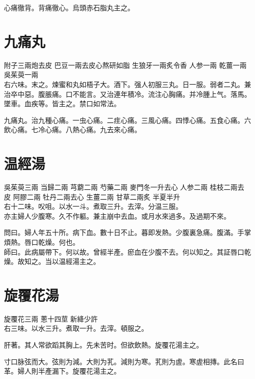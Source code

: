 心痛徹背。背痛徹心。烏頭赤石脂丸主之。

\section{九痛丸}

附子{\scriptsize 三兩炮去皮} 巴豆{\scriptsize 一兩去皮心熬研如脂} 生狼牙{\scriptsize 一兩炙令香} 人参{\scriptsize 一兩} 乾薑{\scriptsize 一兩} 吳茱萸{\scriptsize 一兩}\\
右六味。末之。煉蜜和丸如梧子大。酒下。强人初服三丸。日一服。弱者二丸。兼治卒中惡。腹脹痛。口不能言。又治連年積冷。流注心胸痛。并冷腫上气。落馬。墜車。血疾等。皆主之。禁口如常法。{\wuben}

{\dengben}%

九痛丸。治九種心痛。{\khaaitp 一虫心痛。二疰心痛。三風心痛。四悸心痛。五食心痛。六飲心痛。七冷心痛。八熱心痛。九去來心痛。}

\section{温經湯}

吳茱萸{\scriptsize 三兩} 当歸{\scriptsize 二兩} 芎藭{\scriptsize 二兩} 芍藥{\scriptsize 二兩} 麥門冬{\scriptsize 一升去心} 人参{\scriptsize 二兩} 桂枝{\scriptsize 二兩去皮} 阿膠{\scriptsize 二兩} 牡丹{\scriptsize 二兩去心} 生薑{\scriptsize 二兩} 甘草{\scriptsize 二兩炙} 半夏{\scriptsize 半升}\\
右十二味。㕮咀。以水一斗。煮取三升。去滓。分温三服。\\
亦主婦人少腹寒。久不作軀。兼主崩中去血。或月水來過多。及過期不來。

問曰。婦人年五十所。病下血。數十日不止。暮即发熱。少腹裏急{\khaaitp 痛}。腹滿。手掌煩熱。唇口乾燥。何也。\\
師曰。此病屬帶下。何以故。曾經半產。瘀血在少腹不去。何以知之。其証唇口乾燥。故知之。当以温經湯主之。

\section{旋覆花湯}

旋覆花{\scriptsize 三兩} 蔥{\scriptsize 十四莖} 新絳{\scriptsize 少許}\\
右三味。以水三升。煮取一升。去滓。頓服之。

肝著。其人常欲蹈其胸上。先未苦时。但欲飲熱。旋覆花湯主之。

寸口脉弦而大。弦則为減。大則为芤。減則为寒。芤則为虗。寒虗相摶。此名曰革。婦人則半產漏下。旋覆花湯主之。

